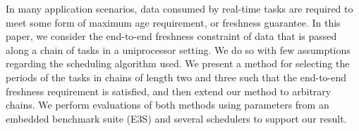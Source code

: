 In many application scenarios, data consumed by real-time tasks are required to meet some form of maximum age requirement, or freshness guarantee. In this paper, we consider the end-to-end freshness constraint of data that is passed along a chain of tasks in a uniprocessor setting. We do so with few assumptions regarding the scheduling algorithm used. We present a method for selecting the periods of the tasks in chains of length two and three such that the end-to-end freshness requirement is satisfied, and then extend our method to arbitrary chains. We perform evaluations of both methods using parameters from an embedded benchmark suite (E3S) and several schedulers to support our result.
